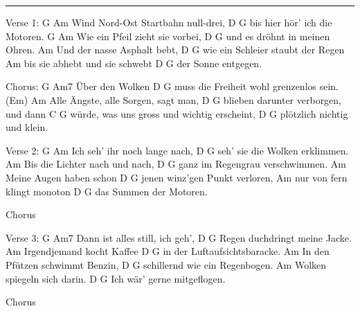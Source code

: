 \noindent\rule{\columnwidth}{1pt}

\begin{multicols}{2}
\begin{lstsong}
Verse 1:
G                           Am
Wind Nord-Ost Startbahn null-drei,
D                        G
bis hier hör' ich die Motoren.
G                          Am
Wie ein Pfeil zieht sie vorbei,
D                        G
und es dröhnt in meinen Ohren.
                       Am
Und der nasse Asphalt bebt,
D                             G
wie ein Schleier staubt der Regen
                          Am
bis sie abhebt und sie schwebt
D             G
der Sonne entgegen.

Chorus:
G         Am7
Über den Wolken
D                         G
muss die Freiheit wohl grenzenlos sein.
(Em)                 Am
Alle Ängste, alle Sorgen, sagt man,
D                    G
blieben darunter verborgen, und dann
C                          G
würde, was uns gross und wichtig erscheint,
D                     G
plötzlich nichtig und klein.
\end{lstsong}
\columnbreak
\begin{lstsong}
Verse 2:
G                        Am
Ich seh' ihr noch lange nach,
D                      G
seh' sie die Wolken erklimmen.
                          Am
Bis die Lichter nach und nach,
D                        G
ganz im Regengrau verschwimmen.
                    Am
Meine Augen haben schon
D                        G
jenen winz'gen Punkt verloren,
                       Am
nur von fern klingt monoton
D                  G
das Summen der Motoren.

Chorus

Verse 3:
G                           Am7
Dann ist alles still, ich geh',
D                        G
Regen duchdringt meine Jacke.
                     Am
Irgendjemand kocht Kaffee
D                      G
in der Luftaufsichtsbaracke.
                           Am
In den Pfützen schwimmt Benzin,
D                         G
schillernd wie ein Regenbogen.
                       Am
Wolken spiegeln sich darin.
D                   G
Ich wär' gerne mitgeflogen.
 
Chorus
\end{lstsong}
\end{multicols}
\newpage

